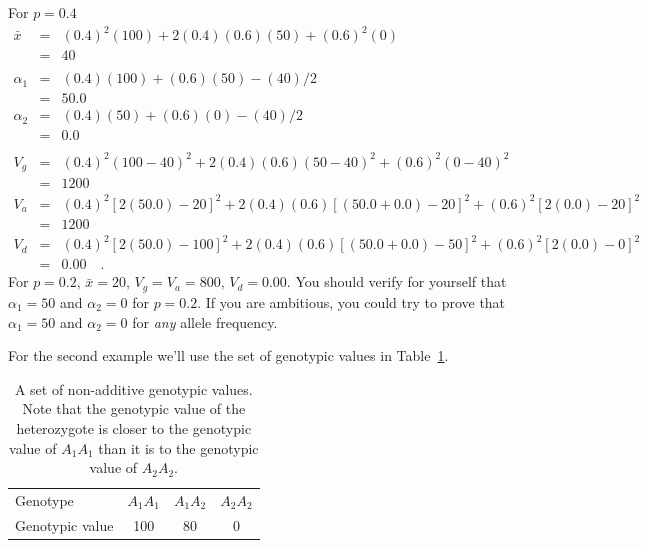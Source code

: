 \documentclass[12pt]{article}
\begin{document}
For $p = 0.4$
\begin{eqnarray*}
{\bar x} &=& (0.4)^2(100) + 2(0.4)(0.6)(50) + (0.6)^2(0) \\
                    &=& 40 \\
\\
\alpha_1 &=& (0.4)(100) + (0.6)(50) - (40)/2 \\
         &=& 50.0 \\
\alpha_2 &=& (0.4)(50) + (0.6)(0) - (40)/2 \\
         &=& 0.0 \\
\\
V_g &=& (0.4)^2(100-40)^2 + 2(0.4)(0.6)(50-40)^2 + (0.6)^2(0-40)^2 \\
    &=& 1200 \\
V_a &=& (0.4)^2[2(50.0)-20]^2 + 2(0.4)(0.6)[(50.0+0.0)-20]^2
       + (0.6)^2[2(0.0)-20]^2 \\
    &=& 1200 \\
V_d &=& (0.4)^2[2(50.0) - 100]^2 + 2(0.4)(0.6)[(50.0+0.0) - 50]^2
       + (0.6)^2[2(0.0) - 0]^2 \\
    &=& 0.00 \quad .
\end{eqnarray*}
For $p = 0.2$, ${\bar x} = 20$, $V_g = V_a = 800$, $V_d = 0.00$.  You
should verify for yourself that $\alpha_1=50$ and $\alpha_2=0$ for
$p=0.2$.  If you are ambitious, you could try to prove that
$\alpha_1=50$ and $\alpha_2=0$ for {\it any\/} allele frequency.

For the second example we'll use the set of genotypic values in
Table~\ref{table:non-additive}.

\begin{table}
\begin{center}
\begin{tabular}{l|ccc}
\hline\hline
Genotype        & $A_1A_1$ & $A_1A_2$ & $A_2A_2$ \\
Genotypic value & 100        & 80      & 0 \\
\hline
\end{tabular}
\end{center}
\caption{A set of non-additive genotypic values. Note that the
  genotypic value of the heterozygote is closer to the genotypic value
  of $A_1A_1$ than it is to the genotypic value of $A_2A_2$.}\label{table:non-additive}
\end{table}
\end{document}
